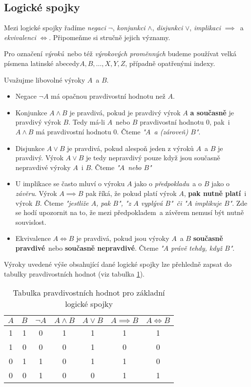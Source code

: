 \subsection{Logické spojky}\label{subsec:logicke_spojky}
Mezi logické spojky řadíme \emph{negaci} $\neg$, \emph{konjunkci} $\land$, \emph{disjunkci} $\lor$, \emph{implikaci} $\implies$~a \emph{ekvivalenci} $\iff$. Připomeňme si stručně jejich významy.
\begin{convention}
    \label{conv:abeceda_vyrokovych_promennych}
    Pro označení \emph{výroků}~nebo též \emph{výrokových proměnných} budeme používat velká písmena latinské abecedy\linebreak $A,B,\dots,X,Y,Z$, případně opatřenými indexy.
\end{convention}
Uvažujme libovolné výroky $A$~a $B$.
\begin{itemize}
    \item Negace $\neg A$ má opačnou pravdivostní hodnotu než $A$.
    \item Konjunkce $A \land B$ je pravdivá, pokud je pravdivý výrok $A$ \textbf{a současně} je pravdivý výrok $B$. Tedy má-li $A$~nebo $B$ pravdivostní hodnotu 0, pak~i $A \land B$ má pravdivostní hodnotu 0. Čteme \emph{"$A$~a (zároveň) $B$"}.
    \item Disjunkce $A \lor B$ je pravdivá, pokud alespoň jeden z výroků $A$~a $B$ je pravdivý. Výrok $A \lor B$ je tedy nepravdivý pouze když jsou současně nepravdivé výroky $A$~i $B$. Čteme \emph{"$A$~nebo $B$"}
    \item U implikace se často mluví o výroku $A$ jako o \emph{předpokladu}~a o $B$ jako o \emph{závěru}. Výrok $A \implies B$ pak říká, že pokud platí výrok $A$, \textbf{pak nutně platí}~i výrok $B$. Čteme \emph{"jestliže $A$, pak $B$", "z $A$ vyplývá $B$"~či "$A$ implikuje $B$"}. Zde se hodí upozornit na to, že mezi předpokladem~a závěrem nemusí být nutně souvislost.
    \item Ekvivalence $A \iff B$ je pravdivá, pokud jsou výroky $A$~a $B$ \textbf{současně pravdivé}~nebo \textbf{současně nepravdivé}. Čteme \emph{"$A$ právě tehdy, když $B$"}.
\end{itemize}
Výroky uvedené výše obsahující dané logické spojky lze přehledně zapsat do tabulky pravdivostních hodnot (viz tabulka \ref{tab:logicke_spojky}).
\begin{table}[H]
    \centering
    \begin{tabular}{|cc|ccccc|}
    \hline
    $A$ & $B$ & $\neg A$ & $A \land B$ & $A \lor B$ & $A \implies B$ & $A \iff B$ \\ \hline
    1   & 1   & 0        & 1           & 1          & 1              & 1          \\
    1   & 0   & 0        & 0           & 1          & 0              & 0          \\
    0   & 1   & 1        & 0           & 1          & 1              & 0          \\
    0   & 0   & 1        & 0           & 0          & 1              & 1          \\ \hline
    \end{tabular}
    \caption{Tabulka pravdivostních hodnot pro základní logické spojky}
    \label{tab:logicke_spojky}
\end{table}
